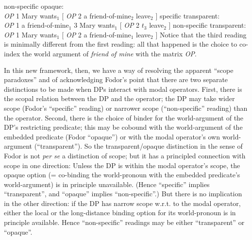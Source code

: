 \pex
\a non-specific opaque:\\
\emph{OP} 1 Mary wants$_1$ [ \emph{OP} 2 a friend-of-mine$_2$ leave$_2$ ]
\a specific transparent:\\
\emph{OP} 1 a friend-of-mine$_1$ 3 Mary wants$_1$ [ \emph{OP} 2 $t_3$ leave$_2$
]
\a non-specific transparent:\\
\emph{OP} 1 Mary wants$_1$ [ \emph{OP} 2 a friend-of-mine$_1$ leave$_2$ ]
\xe
%
Notice that the third reading is minimally different from the first reading: all
that happened is the choice to co-index the world argument of \emph{friend of
  mine} with the matrix \emph{OP}.

In this new framework, then, we have a way of resolving the apparent ``scope
paradoxes'' and of acknowledging Fodor's point that there are two separate
distinctions to be made when DPs interact with modal operators. First, there is
the scopal relation between the DP and the operator; the DP may take wider scope
(Fodor's ``specific'' reading) or narrower scope (``non-specific'' reading) than
the operator. Second, there is the choice of binder for the world-argument of
the DP's restricting predicate; this may be cobound with the world-argument of
the embedded predicate (Fodor ``opaque'') or with the modal operator's own
world-argument (``transparent''). So the transparent/opaque distinction in the
sense of Fodor is not \emph{per se} a distinction of scope; but it has a
principled connection with scope in one direction: Unless the DP is within the
modal operator's scope, the opaque option (= co-binding the world-pronoun with
the embedded predicate's world-argument) is in principle unavailable. (Hence
``specific'' implies ``transparent'', and ``opaque'' implies ``non-specific''.)
But there is no implication in the other direction: if the DP has narrow scope
w.r.t. to the modal operator, either the local or the long-distance binding
option for its world-pronoun is in principle available. Hence ``non-specific''
readings may be either ``transparent'' or ``opaque''.

	
	
